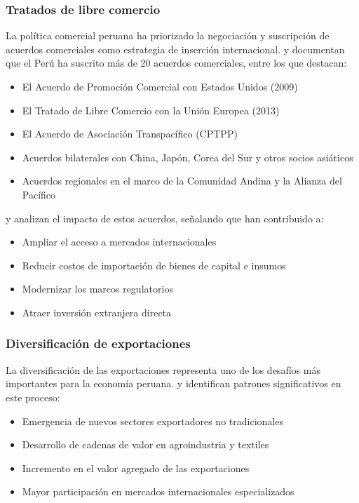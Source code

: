\documentclass[12pt, a4paper]{article}
\begin{document}
\subsubsection{Tratados de libre comercio}
La política comercial peruana ha priorizado la negociación y suscripción de acuerdos comerciales como estrategia de inserción internacional. \textcite{ferrero2018} y \textcite{novak2019} documentan que el Perú ha suscrito más de 20 acuerdos comerciales, entre los que destacan:

\begin{itemize}
    \item El Acuerdo de Promoción Comercial con Estados Unidos (2009)
    \item El Tratado de Libre Comercio con la Unión Europea (2013)
    \item El Acuerdo de Asociación Transpacífico (CPTPP)
    \item Acuerdos bilaterales con China, Japón, Corea del Sur y otros socios asiáticos
    \item Acuerdos regionales en el marco de la Comunidad Andina y la Alianza del Pacífico
\end{itemize}

\textcite{garcia_belaunde2020} y \textcite{morales2021} analizan el impacto de estos acuerdos, señalando que han contribuido a:
\begin{itemize}
    \item Ampliar el acceso a mercados internacionales
    \item Reducir costos de importación de bienes de capital e insumos
    \item Modernizar los marcos regulatorios
    \item Atraer inversión extranjera directa
\end{itemize}

\subsubsection{Diversificación de exportaciones}
La diversificación de las exportaciones representa uno de los desafíos más importantes para la economía peruana. \textcite{vasquez2018} y \textcite{alarco2021} identifican patrones significativos en este proceso:

\begin{itemize}
    \item Emergencia de nuevos sectores exportadores no tradicionales
    \item Desarrollo de cadenas de valor en agroindustria y textiles
    \item Incremento en el valor agregado de las exportaciones
    \item Mayor participación en mercados internacionales especializados
\end{itemize}
\end{document}
